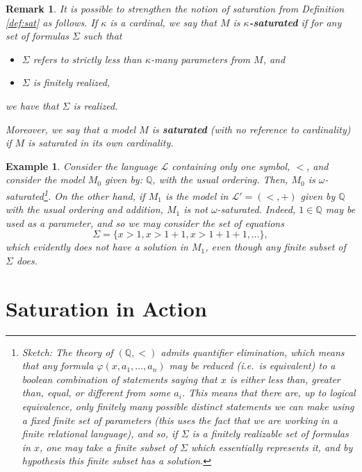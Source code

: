 \documentclass{article}
\newtheorem{remark}[theorem]{Remark}
\newtheorem{example}[theorem]{Example}
\theoremstyle{nonumberplain}
\newcommand{\Q}{\mathbb{Q}}
\newcommand{\Lang}{\mathcal{L}}
\begin{document}
\begin{remark}
It is possible to strengthen the notion of saturation from Definition \ref{def:sat} as follows. If $\kappa$ is a cardinal, we say that $M$ is \textbf{$\kappa$-saturated} if for any set of formulas $\Sigma$ such that
\begin{itemize}
\item $\Sigma$ refers to \emph{strictly less than} $\kappa$-many parameters from $M$, and
\item $\Sigma$ is finitely realized,
\end{itemize}
we have that $\Sigma$ is realized.

Moreover, we say that a model $M$ is \textbf{saturated} (with no reference to cardinality) if $M$ is saturated in its own cardinality.
\end{remark}

\begin{example}
Consider the language $\Lang$ containing only one symbol, $<$, and consider the model $M_0$ given by: $\Q$, with the usual ordering. Then, $M_0$ is $\omega$-saturated\footnote{Sketch: The theory of $(\Q,<)$ admits quantifier elimination, which means that any formula $\varphi(x,a_1, \dots, a_n)$ may be reduced (i.e.\ is equivalent) to a boolean combination of statements saying that $x$ is either less than, greater than, equal, or different from some $a_i$. This means that there are, up to logical equivalence, only finitely many possible distinct statements we can make using a fixed finite set of parameters (this uses the fact that we are working in a finite relational language), and so, if $\Sigma$ is a finitely realizable set of formulas in $x$, one may take a finite subset of $\Sigma$ which essentially represents it, and by hypothesis this finite subset has a solution.}. On the other hand, if $M_1$ is the model in $\Lang' = (<,+)$ given by $\Q$ with the usual ordering and addition, $M_1$ is not $\omega$-saturated. Indeed, $1 \in \Q$ may be used as a parameter, and so we may consider the set of equations
\begin{equation}
\Sigma = \{ x > 1, x > 1+1, x>1+1+1, \dots \},
\end{equation}
which evidently does not have a solution in $M_1$, even though any finite subset of $\Sigma$ does.
\end{example}

\section{Saturation in Action}\label{sec:inaction}
\end{document}
